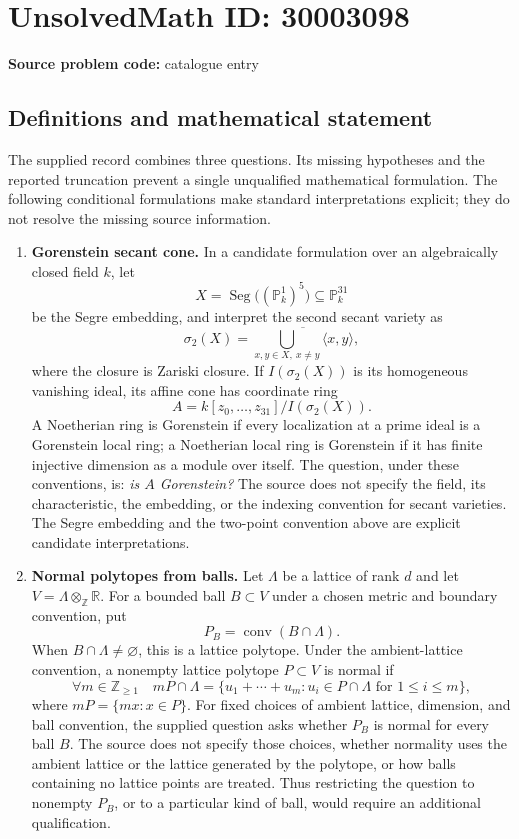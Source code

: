 \documentclass[11pt]{article}
\newcommand{\Z}{\mathbb{Z}}
\newcommand{\R}{\mathbb{R}}
\newcommand{\PP}{\mathbb{P}}
\begin{document}
\section*{UnsolvedMath ID: 30003098}
\textbf{Source problem code:} catalogue entry
\subsection{Definitions and mathematical statement}
The supplied record combines three questions. Its missing hypotheses and the reported truncation prevent a single unqualified mathematical formulation. The following conditional formulations make standard interpretations explicit; they do not resolve the missing source information.

\begin{enumerate}
\item \textbf{Gorenstein secant cone.} In a candidate formulation over an algebraically closed field \(k\), let
\[
X=\operatorname{Seg}\bigl((\PP^1_k)^5\bigr)\subseteq\PP^{31}_k
\]
be the Segre embedding, and interpret the second secant variety as
\[
\sigma_2(X)=\overline{\bigcup_{x,y\in X,\ x\ne y}\langle x,y\rangle},
\]
where the closure is Zariski closure. If \(I(\sigma_2(X))\) is its homogeneous vanishing ideal, its affine cone has coordinate ring
\[
A=k[z_0,\ldots,z_{31}]/I(\sigma_2(X)).
\]
A Noetherian ring is Gorenstein if every localization at a prime ideal is a Gorenstein local ring; a Noetherian local ring is Gorenstein if it has finite injective dimension as a module over itself. The question, under these conventions, is: \emph{is \(A\) Gorenstein?} The source does not specify the field, its characteristic, the embedding, or the indexing convention for secant varieties. The Segre embedding and the two-point convention above are explicit candidate interpretations.

\item \textbf{Normal polytopes from balls.} Let \(\Lambda\) be a lattice of rank \(d\) and let \(V=\Lambda\otimes_{\Z}\R\). For a bounded ball \(B\subset V\) under a chosen metric and boundary convention, put
\[
P_B=\operatorname{conv}(B\cap\Lambda).
\]
When \(B\cap\Lambda\ne\varnothing\), this is a lattice polytope. Under the ambient-lattice convention, a nonempty lattice polytope \(P\subset V\) is normal if
\[
\forall m\in\Z_{\ge1}\quad
mP\cap\Lambda
=
\{u_1+\cdots+u_m:u_i\in P\cap\Lambda\text{ for }1\le i\le m\},
\]
where \(mP=\{mx:x\in P\}\). For fixed choices of ambient lattice, dimension, and ball convention, the supplied question asks whether \(P_B\) is normal for every ball \(B\). The source does not specify those choices, whether normality uses the ambient lattice or the lattice generated by the polytope, or how balls containing no lattice points are treated. Thus restricting the question to nonempty \(P_B\), or to a particular kind of ball, would require an additional qualification.


\end{enumerate}
\end{document}
